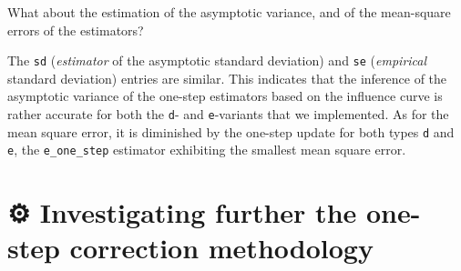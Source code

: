 \documentclass[11pt,openright,twoside]{book}
\newenvironment{Shaded}{\begin{snugshade}}{\end{snugshade}}
\newcommand{\CommentTok}[1]{\textcolor[rgb]{0.56,0.35,0.01}{\textit{#1}}}
\newcommand{\DataTypeTok}[1]{\textcolor[rgb]{0.13,0.29,0.53}{#1}}
\newcommand{\DecValTok}[1]{\textcolor[rgb]{0.00,0.00,0.81}{#1}}
\newcommand{\KeywordTok}[1]{\textcolor[rgb]{0.13,0.29,0.53}{\textbf{#1}}}
\newcommand{\NormalTok}[1]{#1}
\newcommand{\OperatorTok}[1]{\textcolor[rgb]{0.81,0.36,0.00}{\textbf{#1}}}
\newcommand{\StringTok}[1]{\textcolor[rgb]{0.31,0.60,0.02}{#1}}
\newcommand{\gear}{\usebox{\gearbox}\;}
\theoremstyle{definition}
\theoremstyle{definition}
\theoremstyle{definition}
\theoremstyle{remark}
\begin{document}
What about the estimation of the asymptotic variance, and of the mean-square
errors of the estimators?

\begin{Shaded}
\end{Shaded}

The \texttt{sd} (\emph{estimator} of the asymptotic standard deviation) and \texttt{se}
(\emph{empirical} standard deviation) entries are similar. This indicates that the
inference of the asymptotic variance of the one-step estimators based on the
influence curve is rather accurate for both the \texttt{d}- and \texttt{e}-variants that we
implemented. As for the mean square error, it is diminished by the one-step
update for both types \texttt{d} and \texttt{e}, the \texttt{e\_one\_step} estimator exhibiting the
smallest mean square error.

\hypertarget{exo-one-step}{%
\section{\texorpdfstring{⚙ \gear Investigating further the one-step correction methodology}{⚙ Investigating further the one-step correction methodology}}\label{exo-one-step}}
\end{document}
